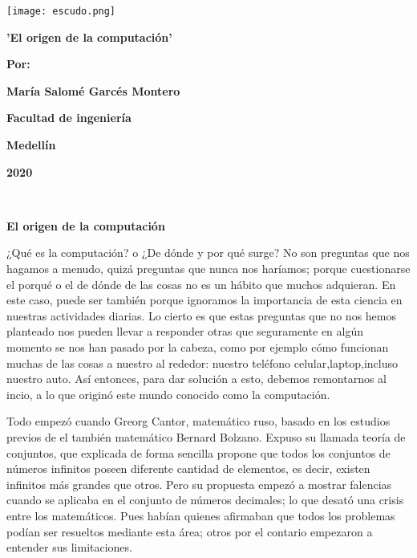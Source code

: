 \documentclass{article}
\begin{document}
\begin{center}
\texttt{[image: escudo.png]}
\end{center}
\vspace{50pt}
\begin{center}
\bf{\sc\Large 'El origen de la computación'}\\
\end{center}
\vspace{50pt}
\begin{center}
\begin{center}
\bf{\sc\large Por:}\\
\end{center}
\bf{\sc\large María Salomé Garcés Montero}\\
\end{center}
\vspace{50pt}
\begin{center}
\bf{\sc\large Facultad de ingeniería}\\
\end{center}
\begin{center}
\bf{\sc\large Medellín}
\end{center}
\begin{center}
\bf{\sc\large 2020}\\
\end{center}\
\newpage
\begin{center}
\bf{\sc\LARGE El origen de la computación}\\
\end{center}
\vspace{50pt}
\large 
¿Qué es la computación? o ¿De dónde y por qué surge?
No son preguntas que nos hagamos a menudo, quizá preguntas que nunca nos haríamos; porque cuestionarse el porqué o el de dónde de las cosas no es un hábito que muchos adquieran. En este caso, puede ser también porque ignoramos la importancia de esta ciencia en nuestras actividades diarias.
Lo cierto es que estas preguntas que no nos hemos planteado nos pueden llevar a responder otras que seguramente en algún momento se nos han pasado por la cabeza, como por ejemplo cómo funcionan muchas de las cosas a nuestro al rededor: nuestro teléfono celular,laptop,incluso nuestro auto. Así entonces, para dar solución a esto, debemos remontarnos al incio, a lo que originó este mundo conocido como la computación. 

\vspace{10PT}

Todo empezó cuando Greorg Cantor, matemático ruso, basado en los estudios previos de el también matemático Bernard Bolzano. Expuso su llamada teoría de conjuntos, que explicada de forma sencilla propone que todos los conjuntos de números infinitos poseen diferente cantidad de elementos, es decir, existen infinitos más grandes que otros. Pero su propuesta empezó a mostrar falencias cuando se aplicaba en el conjunto de números decimales; lo que desató una crisis entre los matemáticos. Pues habían quienes afirmaban que todos los problemas podían ser resueltos mediante esta área; otros por el contario empezaron a entender sus limitaciones.
\end{document}
